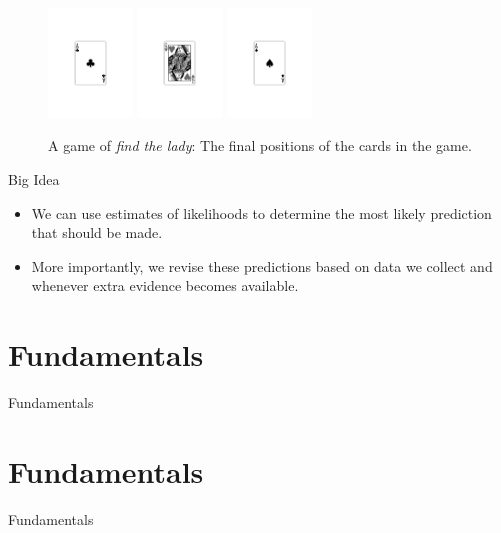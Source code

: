 \documentclass[xcolor={table}]{beamer}
\newcommand{\SectionSlide}[2][]{
	\ifthenelse{\isempty{#1}}
		{\section{#2}\begin{frame} \begin{center}\begin{huge}#2\end{huge}\end{center}\end{frame}}
		{\section[#1]{#2}\begin{frame} \begin{center}\begin{huge}#2\end{huge}\end{center}\end{frame}}
}
\begin{document}
 \begin{frame} [plain]
\begin{figure}
\centering
\label{fig:3cardTrickCards4}\includegraphics[width=0.2\textwidth]{./images/AC.pdf}
\includegraphics[width=0.2\textwidth]{./images/QH_BW.pdf}
\includegraphics[width=0.2\textwidth]{./images/AS.pdf}
\caption{A game of \textit{find the lady}: The final positions of the cards in the game.}
\label{fig:3cardTrick5}
\end{figure}
\end{frame} 

\begin{frame}
	\begin{alertblock}{Big Idea}
		\begin{itemize}
			\item We can use estimates of likelihoods to determine the most likely prediction that should be made.
			\item More importantly, we revise these predictions based on data we collect and whenever extra evidence becomes available.
		\end{itemize}
	\end{alertblock}
\end{frame}

\SectionSlide{Fundamentals}
\end{document}
